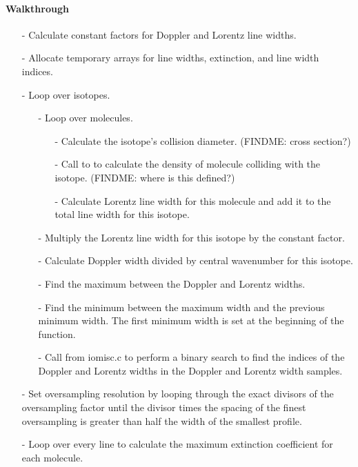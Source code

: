 \documentclass[letterpaper,12pt]{article}
\begin{document}
\paragraph{Walkthrough}
\begin{enumerate}[leftmargin=10pt, noitemsep, parsep=0pt, topsep=0ex]
\item[-] Calculate constant factors for Doppler and Lorentz line widths.
\item[-] Allocate temporary arrays for line widths, extinction, and line width indices.
\item[-] Loop over isotopes.
\begin{enumerate}[leftmargin=10pt, noitemsep, parsep=0pt, topsep=0ex]
\item[-] Loop over molecules.
\begin{enumerate}[leftmargin=10pt, noitemsep, parsep=0pt, topsep=0ex]
\item[-] Calculate the isotope's collision diameter. (FINDME: cross section?)
\item[-] Call to  to calculate the density of molecule colliding with the isotope. (FINDME: where is this defined?)
\item[-] Calculate Lorentz line width for this molecule and add it to the total line width for this isotope.
\end{enumerate}
\item[-] Multiply the Lorentz line width for this isotope by the constant factor.
\item[-] Calculate Doppler width divided by central wavenumber for this isotope.
\item[-] Find the maximum between the Doppler and Lorentz widths.
\item[-] Find the minimum between the maximum width and the previous minimum width. The first minimum width is set at the beginning of the function.
\item[-] Call  from iomisc.c to perform a binary search to find the indices of the Doppler and Lorentz widths in the Doppler and Lorentz width samples.
\end{enumerate}
\item[-] Set oversampling resolution by looping through the exact divisors of the oversampling factor until the divisor times the spacing of the finest oversampling is greater than half the width of the smallest profile.
\item[-] Loop over every line to calculate the maximum extinction coefficient for each molecule.

\end{enumerate}
\end{document}
